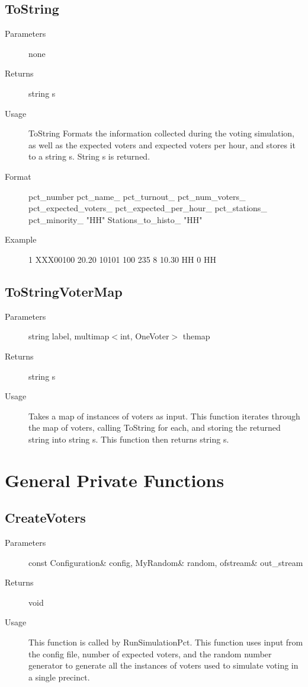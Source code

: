 \subsection{ToString} \label{ngrah-onepct-tostring}
\begin{description}
\item[Parameters] none
\item[Returns] string s
\item[Usage] ToString Formats the information collected during the voting simulation, as well as the expected voters and expected voters per hour, and stores it to a string s.  String s is returned.
\item[Format] pct\_number  pct\_name\_ pct\_turnout\_  pct\_num\_voters\_  pct\_expected\_voters\_  pct\_expected\_per\_hour\_  pct\_stations\_ pct\_minority\_  "HH" Stations\_to\_histo\_ "HH"
\item[Example] 1  XXX00100 20.20      10101     100     235  8   10.30 HH    0 HH
\end{description}

\subsection{ToStringVoterMap}
\begin{description}
\item[Parameters] string label, multimap$<$int, OneVoter$>$ themap
\item[Returns] string s
\item[Usage] Takes a map of instances of voters as input.  This function iterates through the map of voters, calling ToString for each, and storing the returned string into string s.  This function then returns string s.
\end{description}


\section{General Private Functions}

\subsection{CreateVoters}
\begin{description}
\item[Parameters] const Configuration\& config, MyRandom\& random, ofstream\& out\_stream
\item[Returns] void
\item[Usage] This function is called by RunSimulationPct.  This function uses input from the config file, number of expected voters, and the random number generator to generate all the instances of voters used to simulate voting in a single precinct.
\end{description}

